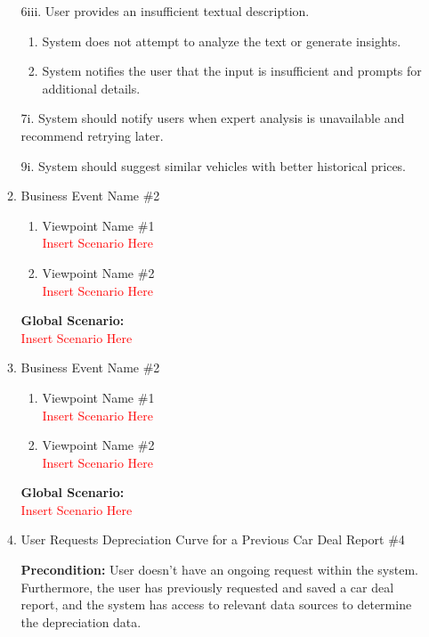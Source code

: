 \documentclass[]{article}
\begin{document}
\begin{enumerate}
\begin{enumerate}[{\bf {BE}1.}]
        6iii. User provides an insufficient textual description.
        \begin{enumerate}[{6iii}.1]
            \item System does not attempt to analyze the text or generate insights.
            \item System notifies the user that the input is insufficient and prompts for additional details.
        \end{enumerate}

        7i. System should notify users when expert analysis is unavailable and recommend retrying later.

        9i. System should suggest similar vehicles with better historical prices.
    
\item Business Event Name \#2
    \begin{enumerate}[{\bf VP1.}]
        \item Viewpoint Name \#1 \\
        \textcolor{red}{Insert Scenario Here}
        \item Viewpoint Name \#2 \\
        \textcolor{red}{Insert Scenario Here}
    \end{enumerate}
    {\bf Global Scenario:}\\
    \textcolor{red}{Insert Scenario Here}

	\item Business Event Name \#2
	\begin{enumerate}[{\bf VP1.}]
		\item Viewpoint Name \#1 \\
		\textcolor{red}{Insert Scenario Here}
		\item Viewpoint Name \#2 \\
		\textcolor{red}{Insert Scenario Here}
	\end{enumerate}
	{\bf Global Scenario:}\\
	\textcolor{red}{Insert Scenario Here}

	\item User Requests Depreciation Curve for a Previous Car Deal Report \#4
	
	{\bf Precondition:} User doesn't have an ongoing request within the system. Furthermore, the user has previously requested and saved a car deal report, and the system 
	has access to relevant data sources to determine the depreciation data.


\end{enumerate}
\end{enumerate}
\end{document}
